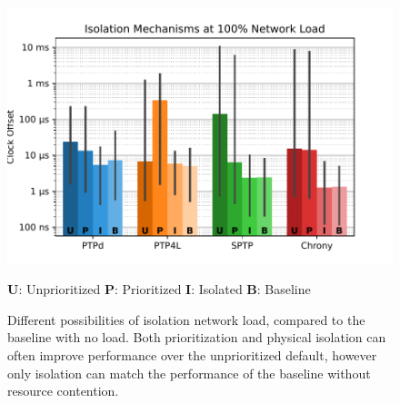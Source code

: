\begin{figure}
    \includegraphics[width=\linewidth]{res/generated/net_isolation_comparison.pdf}
    \begin{center}
    \vspace{-0.5cm}
    \sffamily\scriptsize \textbf{U}: Unprioritized \quad\textbf{P}: Prioritized \quad\textbf{I}: Isolated \quad\textbf{B}: Baseline
    \end{center}
    \caption{Different possibilities of isolation network load, compared to the baseline with no load. Both prioritization and physical isolation can often improve performance over the unprioritized default, however only isolation can match the performance of the baseline without resource contention.}
    \label{fig:net_isolation_comparison}
\end{figure}

